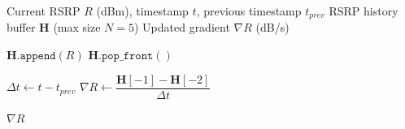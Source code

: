 \begin{algorithm}[t]
\caption{RSRP Gradient Update}
\label{alg:rsrp}
\begin{algorithmic}[1]
\Require Current RSRP $R$ (dBm), timestamp $t$, previous timestamp $t_{prev}$
\Require RSRP history buffer $\mathbf{H}$ (max size $N=5$)
\Ensure Updated gradient $\nabla R$ (dB/s)

\Statex

\State $\mathbf{H}.\texttt{append}(R)$ 
    \State $\mathbf{H}.\texttt{pop\_front}()$ 
\EndIf

\Statex

    \State $\Delta t \gets t - t_{prev}$
        \State $\nabla R \gets \dfrac{\mathbf{H}[-1] - \mathbf{H}[-2]}{\Delta t}$ 
    \EndIf
\EndIf

\Statex

\State \Return $\nabla R$

\end{algorithmic}
\end{algorithm}


%
